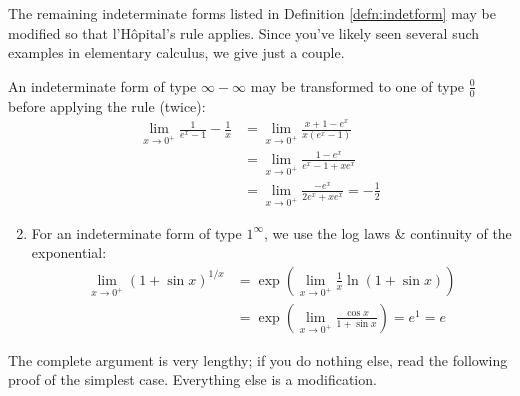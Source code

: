\goodbreak



The remaining indeterminate forms listed in Definition \ref{defn:indetform} may be modified so that l'Hôpital's rule applies. Since you've likely seen several such examples in elementary calculus, we give just a couple.

\begin{examples}{}{}
	\exstart An indeterminate form of type $\infty-\infty$ may be transformed to one of type $\frac 00$ before applying the rule (twice):
	  \begin{align*}
	  	\lim\limits_{x\to 0^+}\frac 1{e^x-1}-\frac 1x
	  	&=\lim\limits_{x\to 0^+}\frac{x+1-e^x}{x(e^x-1)} \tag{type $\frac 00$}\\
	  	&=\lim\limits_{x\to 0^+}\frac{1-e^x}{e^x-1+xe^x} \tag{still type $\frac 00$}\\
	  	&=\lim\limits_{x\to 0^+}\frac{-e^x}{2e^x+xe^x} =-\frac 12
	  \end{align*}
	\begin{enumerate}\setcounter{enumi}{1}
	 	\item For an indeterminate form of type $1^\infty$, we use the log laws \& continuity of the exponential:
	 	\begin{align*}
		 	\lim_{x\to 0^+} (1+\sin x)^{1/x}
		 	&=\exp\left(\lim_{x\to 0^+} \frac 1x\ln(1+\sin x)\right) \tag{type $\frac 00$}\\
		 	&=\exp\left(\lim_{x\to 0^+} \frac{\cos x}{1+\sin x}\right) 
		 	=e^1=e
	 	\end{align*}
 	\end{enumerate}
\end{examples}



The complete argument is very lengthy; if you do nothing else, read the following proof of the simplest case. Everything else is a modification.

